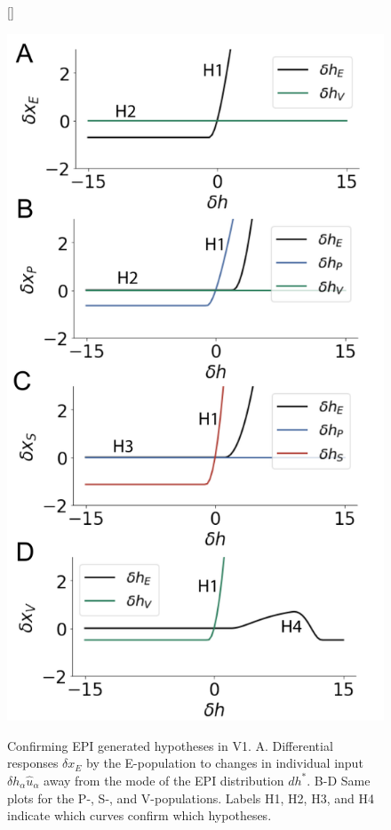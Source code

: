 \documentclass[11pt]{article}
\begin{document}
\begin{figure}
[\FBwidth]
{\caption{Confirming EPI generated hypotheses in V1. A. Differential responses $\delta x_E$ by the E-population to changes in individual input $\delta h_\alpha \hat{u}_\alpha$ away from the mode of the EPI distribution $dh^*$. B-D Same plots for the P-, S-, and V-populations.  Labels H1, H2, H3, and H4 indicate which curves confirm which hypotheses.}\label{fig:V1_HT}}
{\includegraphics[scale=0.6]{figures/fig3/fig3.pdf}}
\end{figure}
\end{document}
